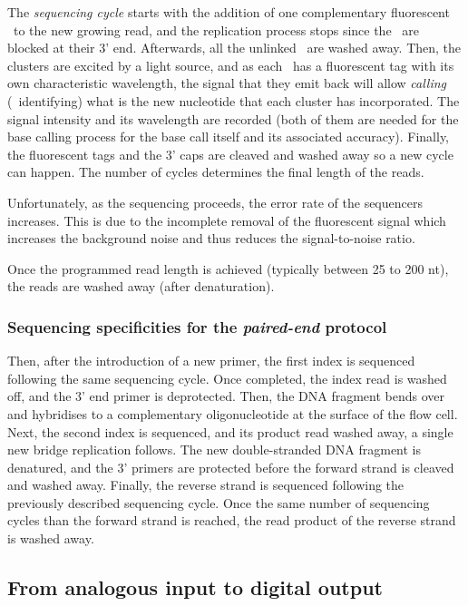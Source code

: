 The \emph{sequencing cycle} starts with the addition of one complementary
fluorescent \dNTP\ to the new growing read, and
the replication process stops since the \dNTPs\ are blocked at their 3' end.
Afterwards, all the unlinked
\dNTPs\ are washed away. Then, the clusters are excited by a light source,
and as each
\dNTPs\ has a fluorescent tag with its own characteristic wavelength, the
signal that they emit back will allow \emph{calling} (\ie\ identifying) what is the
new nucleotide that each cluster has incorporated. The signal intensity and
its wavelength are recorded (both of them are needed for the base calling
process for the base call itself and its associated accuracy). Finally,
the fluorescent tags and the 3' caps are cleaved
and washed away so a new cycle can happen.
The number of cycles determines the final length of the reads.\mybr\

Unfortunately, as the sequencing proceeds, the error rate of the sequencers
increases. This is due to the incomplete removal of the fluorescent signal which
increases the background noise and thus reduces the signal-to-noise ratio.\mybr\

Once the programmed read length is achieved (typically between 25 to 200 \gls{nt}),
the reads are washed away (after denaturation).\mybr\

\subsubsection{Sequencing specificities for the \emph{paired-end} protocol}

Then, after the introduction of a new primer, the first index is sequenced
following the same sequencing cycle.
Once completed, the index read is washed off, and the 3' end primer is deprotected.
Then, the \gls{DNA} fragment bends over and hybridises to a complementary
oligonucleotide at the surface of the flow cell.
Next, the second index is sequenced, and its product read washed away,
a single new bridge replication follows.
The new double-stranded \gls{DNA} fragment is denatured, and the 3' primers are
protected before the forward strand is cleaved and washed away.
Finally, the reverse strand is sequenced following the previously described
sequencing cycle. Once the same number of sequencing cycles than the forward
strand is reached, the read product of the reverse strand is washed away.\mybr\

\subsection{From analogous input to digital output}

